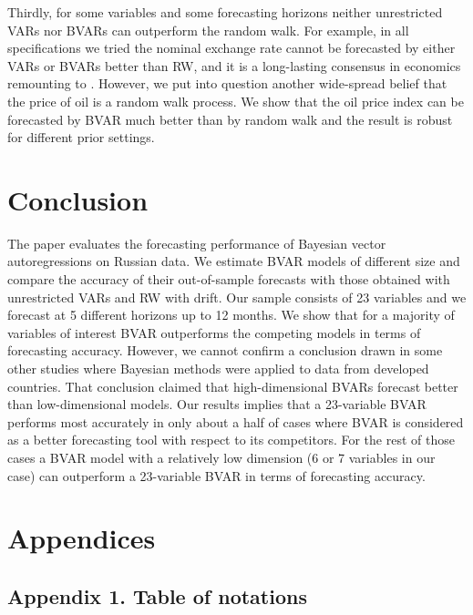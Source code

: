 \documentclass[11pt]{article} %
\begin{document}
Thirdly, for some variables and some forecasting horizons neither unrestricted VARs nor BVARs can outperform  the random walk. For example, in all specifications we tried the nominal exchange rate cannot be forecasted by either VARs or BVARs better than RW, and it is a long-lasting consensus in economics remounting to \cite{meese_rogoff_1983}. However, we put into question another wide-spread belief that the price of oil is a random walk process. We show that the oil price index can be forecasted by BVAR much better than by random walk and the result is robust for different prior settings.

\section{Conclusion}

The paper evaluates the forecasting performance of Bayesian vector autoregressions on Russian data. We estimate BVAR models of different size and compare the accuracy of their out-of-sample forecasts with those obtained with unrestricted VARs and RW with drift.   Our sample consists of 23 variables and we forecast at 5 different horizons up to 12 months. We show that for a majority of variables of interest BVAR  outperforms the competing models in terms of forecasting accuracy. 
However, we cannot confirm a conclusion drawn in some other studies where Bayesian methods were applied to data from developed countries. That conclusion claimed that high-dimensional BVARs forecast better than low-dimensional models. Our results implies that a 23-variable BVAR performs most accurately in only about a half of cases where BVAR is considered as a better forecasting tool with respect to its competitors. For the rest of those cases    a BVAR model with a relatively low dimension (6 or 7 variables in our case)   can outperform a 23-variable BVAR in terms of forecasting accuracy.




\newpage

\printbibliography

\newpage


\section*{Appendices}


\subsection*{Appendix 1. Table of notations}
\end{document}
